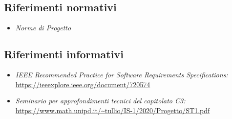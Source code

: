 \subsection{Riferimenti normativi}
\begin{itemize}
	\item \textit{Norme di Progetto}
\end{itemize}
\subsection{Riferimenti informativi}
\begin{itemize}
	\item \textit{IEEE Recommended Practice for Software Requirements Specifications:}\\
	\url{https://ieeexplore.ieee.org/document/720574}
	\item \textit{Seminario per approfondimenti tecnici del capitolato C3:}\\
	\url{https://www.math.unipd.it/~tullio/IS-1/2020/Progetto/ST1.pdf}		
\end{itemize}